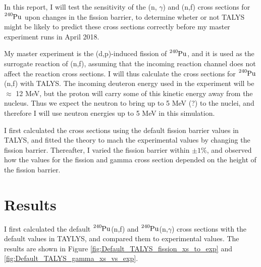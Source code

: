 \documentclass[]{article}
\begin{document}
\par 
\vspace{3mm}

In this report, I will test the sensitivity of the (n, $\gamma$) and (n,f) cross sections for $\ce{^{240}Pu}$ upon changes in the fission barrier, to determine wheter or not TALYS might be likely to predict these cross sections correctly before my master experiment runs in April 2018.

\par 
\vspace{3mm}

My master experiment is the (d,p)-induced fission of $\ce{^{240}Pu}$, and it is used as the surrogate reaction of (n,f), assuming that the incoming reaction channel does not affect the reaction cross sections. I will thus calculate the cross sections for $\ce{^{240}Pu}$(n,f) with TALYS. The incoming deuteron energy used in the experiment will be $\approx$ 12 MeV, but the proton will carry some of this kinetic energy away from the nucleus. Thus we expect the neutron to bring up to 5 MeV (?) to the nuclei, and therefore I will use neutron energies up to 5 MeV in this simulation. 
\par 
\vspace{3mm}

I first calculated the cross sections using the default fission barrier values in TALYS, and fitted the theory to mach the experimental values by changing the fission barrier. Thereafter, I varied the fission barrier within $\pm 1 \%$, and observed how the values for the fission and gamma cross section depended on the height of the fission barrier.

\section{Results}

I first calculated the default $\ce{^{240}Pu}$(n,f) and $\ce{^{240}Pu}$(n,$\gamma$) cross sections with the default values in TAYLYS, and compared them to experimental values. The results are shown in Figure \ref{fig:Default_TALYS_fission_xs_to_exp} and \ref{fig:Default_TALYS_gamma_xs_vs_exp}.
\end{document}
